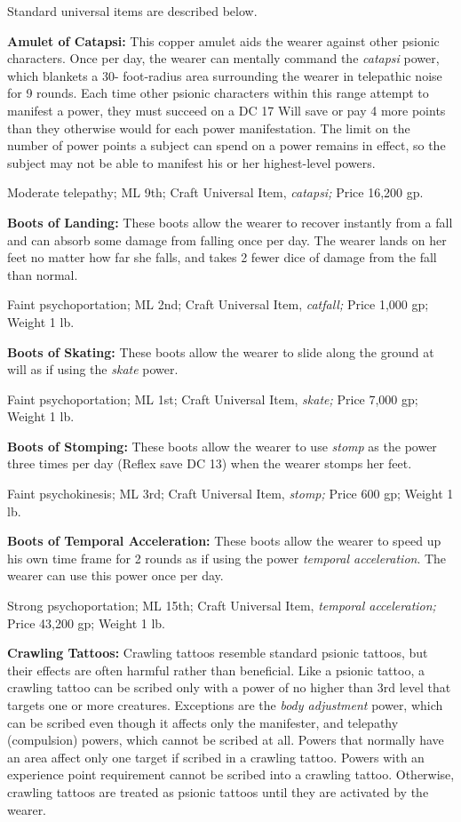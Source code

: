 \documentclass{article}
\begin{document}
Standard universal items are described below.

\textbf{Amulet of Catapsi:} This copper amulet aids the wearer against other psionic 
characters. Once per day, the wearer can mentally command the \textit{catapsi }power, 
which blankets a 30- foot-radius area surrounding the wearer in telepathic noise 
for 9 rounds. Each time other psionic characters within this range attempt to manifest 
a power, they must succeed on a DC 17 Will save or pay 4 more points than they 
otherwise would for each power manifestation. The limit on the number of power 
points a subject can spend on a power remains in effect, so the subject may not 
be able to manifest his or her highest-level powers.

Moderate telepathy; ML 9th; Craft Universal Item, \textit{catapsi; }Price 16,200 
gp.

\textbf{Boots of Landing:} These boots allow the wearer to recover instantly from 
a fall and can absorb some damage from falling once per day. The wearer lands on 
her feet no matter how far she falls, and takes 2 fewer dice of damage from the 
fall than normal.

Faint psychoportation; ML 2nd; Craft Universal Item, \textit{catfall; }Price 1,000 
gp; Weight 1 lb.

\textbf{Boots of Skating:} These boots allow the wearer to slide along the ground 
at will as if using the \textit{skate }power.

Faint psychoportation; ML 1st; Craft Universal Item, \textit{skate; }Price 7,000 
gp; Weight 1 lb.

\textbf{Boots of Stomping: }These boots allow the wearer to use \textit{stomp }as 
the power three times per day (Reflex save DC 13) when the wearer stomps her feet. 

Faint psychokinesis; ML 3rd; Craft Universal Item, \textit{stomp; }Price 600 gp; 
Weight 1 lb.

\textbf{Boots of Temporal Acceleration:} These boots allow the wearer to speed 
up his own time frame for 2 rounds as if using the power \textit{temporal acceleration}. 
The wearer can use this power once per day.

Strong psychoportation; ML 15th; Craft Universal Item, \textit{temporal acceleration; 
}Price 43,200 gp; Weight 1 lb.

\textbf{Crawling Tattoos:} Crawling tattoos resemble standard psionic tattoos, 
but their effects are often harmful rather than beneficial. Like a psionic tattoo, 
a crawling tattoo can be scribed only with a power of no higher than 3rd level 
that targets one or more creatures. Exceptions are the \textit{body adjustment 
}power, which can be scribed even though it affects only the manifester, and telepathy 
(compulsion) powers, which cannot be scribed at all. Powers that normally have 
an area affect only one target if scribed in a crawling tattoo. Powers with an 
experience point requirement cannot be scribed into a crawling tattoo. Otherwise, 
crawling tattoos are treated as psionic tattoos until they are activated by the 
wearer.
\end{document}
